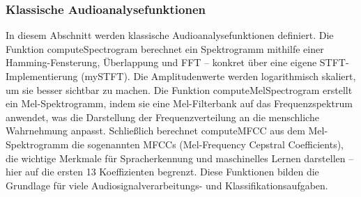 \subsubsection{Klassische Audioanalysefunktionen}

In diesem Abschnitt werden klassische Audioanalysefunktionen definiert. Die Funktion computeSpectrogram berechnet ein Spektrogramm mithilfe einer Hamming-Fensterung, Überlappung und FFT – konkret über eine eigene STFT-Implementierung (mySTFT). Die Amplitudenwerte werden logarithmisch skaliert, um sie besser sichtbar zu machen. Die Funktion computeMelSpectrogram erstellt ein Mel-Spektrogramm, indem sie eine Mel-Filterbank auf das Frequenzspektrum anwendet, was die Darstellung der Frequenzverteilung an die menschliche Wahrnehmung anpasst. Schließlich berechnet computeMFCC aus dem Mel-Spektrogramm die sogenannten MFCCs (Mel-Frequency Cepstral Coefficients), die wichtige Merkmale für Spracherkennung und maschinelles Lernen darstellen – hier auf die ersten 13 Koeffizienten begrenzt. Diese Funktionen bilden die Grundlage für viele Audiosignalverarbeitungs- und Klassifikationsaufgaben. \cite{Hossain:2025} \cite{MathWorks:2025SignalToolbox} \cite{Pfister:2017}

